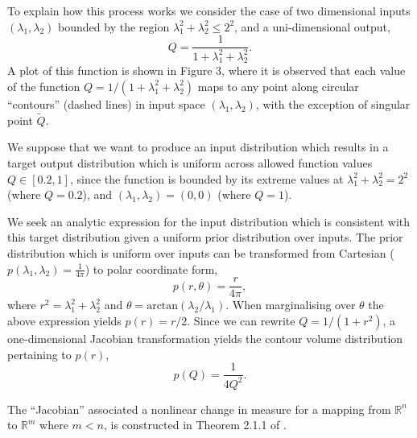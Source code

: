 \documentclass[10pt,letterpaper]{article}
\begin{document}
\vspace{0.5cm}

\bigskip
{}

To explain how this process works we consider the case of two dimensional inputs $(\lambda_1,\lambda_2)$ bounded by the region $\lambda_1^2+\lambda_2^2\leq 2^2$, and a uni-dimensional output,
%
\begin{equation}\label{eq:QSimple}
Q = \frac{1}{1+\lambda_1^2+\lambda_2^2}.
\end{equation}
%
A plot of this function is shown in Figure 3, where it is observed that each value of the function $Q = 1/(1+\lambda_1^2+\lambda_2^2)$ maps to any point along circular ``contours'' (dashed lines) in input space $(\lambda_1,\lambda_2)$, with the exception of singular point $\tilde{Q}$.



We suppose that we want to produce an input distribution which results in a target output distribution which is uniform across allowed function values $Q\in[0.2,1]$, since the function is bounded by its extreme values at $\lambda_1^2+\lambda_2^2=2^2$ (where $Q=0.2$), and $(\lambda_1,\lambda_2)=(0,0)$ (where $Q=1$).

We seek an analytic expression for the input distribution which is consistent with this target distribution given a uniform prior distribution over inputs. The prior distribution which is uniform over inputs can be transformed from Cartesian ($p(\lambda_1,\lambda_2) = \frac{1}{4 \pi}$) to polar coordinate form,
%
\begin{equation}
p(r,\theta) = \frac{r}{4\pi},
\end{equation}
%
where $r^2 = \lambda_1^2+\lambda_2^2$ and $\theta = \text{arctan}(\lambda_2/\lambda_1)$. When marginalising over $\theta$ the above expression yields $p(r) = r / 2$. Since we can rewrite $Q = 1 / (1+ r^2)$, a one-dimensional Jacobian transformation yields the contour volume distribution pertaining to $p(r)$,
%
\begin{equation}\label{eq:trueContours}
p(Q) = \frac{1}{4 Q^2}.
\end{equation}

 The ``Jacobian'' associated a nonlinear change in measure for a mapping from ${\mathbb R}^n$ to ${\mathbb R}^m$ where $m<n$, is constructed in Theorem 2.1.1 of \cite{Lei-phdthesis}.
\end{document}
